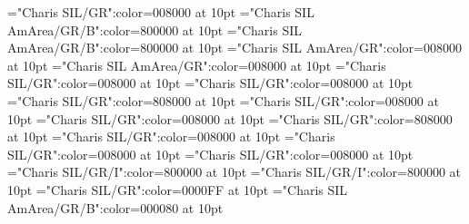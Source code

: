 \documentclass[a4paper,twoside]{article}
\begin{document}
\font\spanmainentrysubsensessensessensespanspanentryletDatadicBody="Charis SIL/GR":color=008000 at 10pt
\font\sensenumbersensecontentsensessensesensecontentsensesmainentrycomplexspanmainentrysubsensessensessensespanspanentryletDatadicBody="Charis SIL AmArea/GR/B":color=800000 at 10pt
\font\spansensenumbersensecontentsensessensesensecontentsensesmainentrycomplexspanmainentrysubsensessensessensespanspanentryletDatadicBody="Charis SIL AmArea/GR/B":color=800000 at 10pt
\font\sensespanmainentrysubsensessensessensespanspanentryletDatadicBody="Charis SIL AmArea/GR":color=008000 at 10pt
\font\spansensespanmainentrysubsensessensessensespanspanentryletDatadicBody="Charis SIL AmArea/GR":color=008000 at 10pt
\font\spanesspansensespanmainentrysubsensessensessensespanspanentryletDatadicBody="Charis SIL/GR":color=008000 at 10pt
\font\spanspansensespanmainentrysubsensessensessensespanspanentryletDatadicBody="Charis SIL/GR":color=008000 at 10pt
\font\restrictionssensespanmainentrysubsensessensessensespanspanentryletDatadicBody="Charis SIL/GR":color=808000 at 10pt
\font\spanesrestrictionssensespanmainentrysubsensessensessensespanspanentryletDatadicBody="Charis SIL/GR":color=008000 at 10pt
\font\spanspanesrestrictionssensespanmainentrysubsensessensessensespanspanentryletDatadicBody="Charis SIL/GR":color=008000 at 10pt
\font\spanrestrictionssensespanmainentrysubsensessensessensespanspanentryletDatadicBody="Charis SIL/GR":color=808000 at 10pt
\font\spanspanmainentrysubsensessensessensespanspanentryletDatadicBody="Charis SIL/GR":color=008000 at 10pt
\font\spanspanspanspanentryletDatadicBody="Charis SIL/GR":color=008000 at 10pt
\font\spanspanspanspanspanentryletDatadicBody="Charis SIL/GR":color=008000 at 10pt
\font\spanesspanspanspanspanspanentryletDatadicBody="Charis SIL/GR/I":color=800000 at 10pt
\font\spanabbreviationvariantentrytypevariantentrytypesvariantformentrybackrefsentryspanspanspanspanspanentryletDatadicBody="Charis SIL/GR/I":color=800000 at 10pt
\font\headwordspanspanentryletDatadicBody="Charis SIL/GR":color=0000FF at 10pt
\font\spanmxbheadwordspanspanentryletDatadicBody="Charis SIL AmArea/GR/B":color=000080 at 10pt
\end{document}
